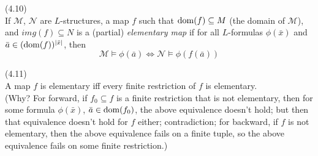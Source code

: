 \documentclass[a4paper]{article}
\begin{document}
\begin{defi} (4.10)\\
    If $\mathcal{M}$, $\mathcal{N}$ are $L$-structures, a map $f$ such that $\operatorname{dom} (f) \subseteq M$ (the domain of $\mathcal{M}$), and $img(f) \subseteq N$ is a (partial) \emph{elementary map} if for all $L$-formulas $\phi(\bar{x})$ and $\bar{a} \in (\operatorname{dom}(f))^{|\bar{x}|}$, then
    $$\mathcal{M} \vDash \phi(\bar{a}) \iff \mathcal{N} \vDash \phi(f(\bar{a}))$$
\end{defi}

\begin{rem} (4.11)\\
    A map $f$ is elementary iff every finite restriction of $f$ is elementary.\\
    (Why? For forward, if $f_0 \subseteq f$ is a finite restriction that is not elementary, then for some formula $\phi(\bar{x})$, $\bar{a} \in \operatorname{dom} (f_0)$, the above equivalence doesn't hold; but then that equivalence doesn't hold for $f$ either; contradiction; for backward, if $f$ is not elementary, then the above equivalence fails on a finite tuple, so the above equivalence fails on some finite restriction.)
\end{rem}
\end{document}
